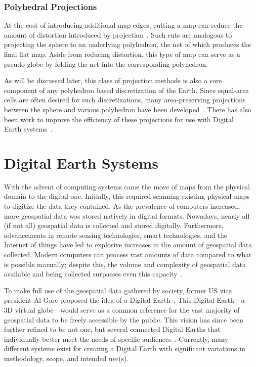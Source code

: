 \subsubsection{Polyhedral Projections} \label{chap:2:polyproj}
At the cost of introducing additional map edges, cutting a map can reduce the amount of distortion introduced by projection~\cite{soliman2018optimal}.
Such cuts are analogous to projecting the sphere to an underlying polyhedron, the net of which produces the final flat map.
Aside from reducing distortion, this type of map can serve as a pseudo-globe by folding the net into the corresponding polyhedron.


As will be discussed later, this class of projection methods is also a core component of any polyhedron based discretization of the Earth.
Since equal-area cells are often desired for such discretizations, many area-preserving projections between the sphere and various polyhedron have been developed~\cite{bradley1946equal, snyder1992equal, van2006slice, rocsca2011uniform, rocsca2012area, holhocs2014octahedral}.
There has also been work to improve the efficiency of these projections for use with Digital Earth systems~\cite{harrison2011optimization}.


\section{Digital Earth Systems} \label{chap:2:DE}
With the advent of computing systems came the move of maps from the physical domain to the digital one.
Initially, this required scanning existing physical maps to digitize the data they contained.
As the prevalence of computers increased, more geospatial data was stored natively in digital formats.
Nowadays, nearly all (if not all) geospatial data is collected and stored digitally.
Furthermore, advancements in remote sensing technologies, smart technologies, and the Internet of things have led to explosive increases in the amount of geospatial data collected.
Modern computers can process vast amounts of data compared to what is possible manually; despite this, the volume and complexity of geospatial data available and being collected surpasses even this capacity~\cite{lee2015geospatial}.


To make full use of the geospatial data gathered by society, former US vice president Al Gore proposed the idea of a Digital Earth~\cite{gore1998}.
This Digital Earth---a 3D virtual globe---would serve as a common reference for the vast majority of geospatial data to be freely accessible by the public.
This vision has since been further refined to be not one, but several connected Digital Earths that individually better meet the needs of specific audiences~\cite{goodchild2012next}.
Currently, many different systems exist for creating a Digital Earth with significant variations in methodology, scope, and intended use(s).



